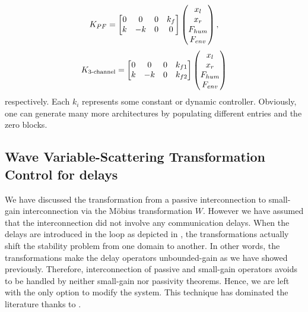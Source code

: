 \[
K_{PF} = \begin{bmatrix}
0&0&0&k_f\\
k&-k&0&0
\end{bmatrix}\begin{pmatrix}x_l\\x_r\\F_{hum}\\F_{env}\end{pmatrix},
\]
\[
K_{3\text{-channel}} = \begin{bmatrix}
0&0&0&k_{f1}\\
k&-k&0&k_{f2}
\end{bmatrix}\begin{pmatrix}x_l\\x_r\\F_{hum}\\F_{env}\end{pmatrix}
\]
respectively. Each $k_i$ represents some constant or dynamic controller. Obviously, one can 
generate many more architectures by populating different entries and the zero blocks. 


\subsection{Wave Variable-Scattering Transformation Control for delays}

We have discussed the transformation from a passive interconnection to small-gain interconnection via
the M\"{o}bius transformation $W$. However we have assumed that the interconnection did not involve any 
communication delays. When the delays are introduced in the loop as depicted in , 
the transformations actually shift the stability problem from one domain to another. In other words, 
the transformations make the delay operators unbounded-gain as we have showed previously. Therefore, 
interconnection of passive and small-gain operators avoids to be handled by neither small-gain nor 
passivity theorems. Hence, we are left with the only option to modify the system. This technique has 
dominated the literature thanks to \cite{andersonspong,nieslotine, nieslotine2}. 

%

